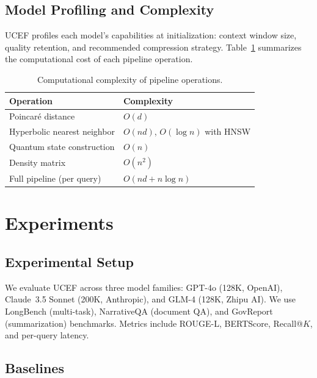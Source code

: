 \documentclass[11pt,a4paper]{article}
\newcommand{\ucef}{\textsf{UCEF}}
\begin{document}
\subsection{Model Profiling and Complexity}

\ucef{} profiles each model's capabilities at initialization:
context window size, quality retention, and recommended compression
strategy.  Table~\ref{tab:complexity} summarizes the computational cost of
each pipeline operation.

\begin{table}[t]
\centering
\caption{Computational complexity of pipeline operations.}
\label{tab:complexity}
\small
\begin{tabular}{@{}ll@{}}
\toprule
Operation & Complexity \\
\midrule
Poincar\'{e} distance      & $O(d)$ \\
Hyperbolic nearest neighbor & $O(nd)$, $O(\log n)$ with HNSW \\
Quantum state construction  & $O(n)$ \\
Density matrix              & $O(n^{2})$ \\
Full pipeline (per query)   & $O(nd + n\log n)$ \\
\bottomrule
\end{tabular}
\end{table}


\section{Experiments}
\label{sec:experiments}

\subsection{Experimental Setup}

We evaluate \ucef{} across three model families:
GPT-4o (128K, OpenAI), Claude~3.5 Sonnet (200K, Anthropic),
and GLM-4 (128K, Zhipu AI).
We use LongBench (multi-task), NarrativeQA (document QA), and GovReport
(summarization) benchmarks.  Metrics include ROUGE-L, BERTScore,
Recall@$K$, and per-query latency.

\subsection{Baselines}
\end{document}

